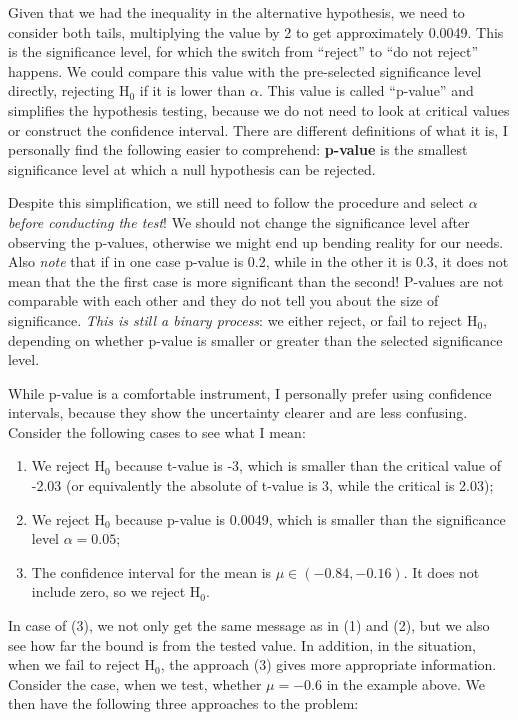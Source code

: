 \documentclass[
]{book}
\providecommand{\tightlist}{%
  \setlength{\itemsep}{0pt}\setlength{\parskip}{0pt}}
\theoremstyle{definition}
\theoremstyle{definition}
\theoremstyle{definition}
\theoremstyle{definition}
\theoremstyle{remark}
\begin{document}
Given that we had the inequality in the alternative hypothesis, we need to consider both tails, multiplying the value by 2 to get approximately 0.0049. This is the significance level, for which the switch from ``reject'' to ``do not reject'' happens. We could compare this value with the pre-selected significance level directly, rejecting \(\mathrm{H}_0\) if it is lower than \(\alpha\). This value is called ``p-value'' and simplifies the hypothesis testing, because we do not need to look at critical values or construct the confidence interval. There are different definitions of what it is, I personally find the following easier to comprehend: \textbf{p-value} is the smallest significance level at which a null hypothesis can be rejected.

Despite this simplification, we still need to follow the procedure and select \(\alpha\) \emph{before conducting the test}! We should not change the significance level after observing the p-values, otherwise we might end up bending reality for our needs. Also \emph{note} that if in one case p-value is 0.2, while in the other it is 0.3, it does not mean that the the first case is more significant than the second! P-values are not comparable with each other and they do not tell you about the size of significance. \emph{This is still a binary process}: we either reject, or fail to reject \(\mathrm{H}_0\), depending on whether p-value is smaller or greater than the selected significance level.

While p-value is a comfortable instrument, I personally prefer using confidence intervals, because they show the uncertainty clearer and are less confusing. Consider the following cases to see what I mean:

\begin{enumerate}
\def\labelenumi{\arabic{enumi}.}
\tightlist
\item
  We reject \(\mathrm{H}_0\) because t-value is -3, which is smaller than the critical value of -2.03 (or equivalently the absolute of t-value is 3, while the critical is 2.03);
\item
  We reject \(\mathrm{H}_0\) because p-value is 0.0049, which is smaller than the significance level \(\alpha=0.05\);
\item
  The confidence interval for the mean is \(\mu \in (-0.84, -0.16)\). It does not include zero, so we reject \(\mathrm{H}_0\).
\end{enumerate}

In case of (3), we not only get the same message as in (1) and (2), but we also see how far the bound is from the tested value. In addition, in the situation, when we fail to reject \(\mathrm{H}_0\), the approach (3) gives more appropriate information. Consider the case, when we test, whether \(\mu=-0.6\) in the example above. We then have the following three approaches to the problem:
\end{document}

